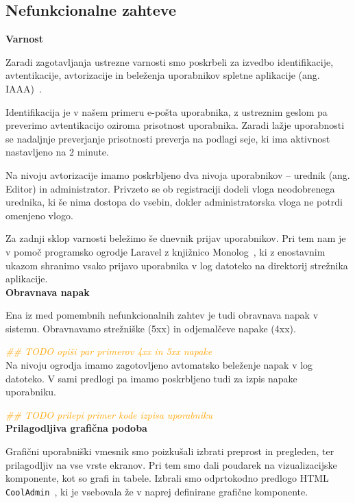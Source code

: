 \documentclass[a4paper, 12pt]{book}
\begin{document}
\clearpage



\subsection{Nefunkcionalne zahteve}

\noindent \textbf{Varnost}

Zaradi zagotavljanja ustrezne varnosti smo poskrbeli za izvedbo identifikacije, avtentikacije, avtorizacije in beleženja uporabnikov spletne aplikacije (ang. IAAA)~\cite{IAAA-security}.

Identifikacija je v našem primeru e-pošta uporabnika, z ustreznim geslom pa preverimo avtentikacijo oziroma prisotnost uporabnika. Zaradi lažje uporabnosti se nadaljnje preverjanje prisotnosti preverja na podlagi seje, ki ima aktivnost nastavljeno na 2 minute. 

Na nivoju avtorizacije imamo poskrbljeno dva nivoja uporabnikov – urednik (ang. Editor) in administrator. Privzeto se ob registraciji dodeli vloga neodobrenega urednika, ki še nima dostopa do vsebin, dokler administratorska vloga ne potrdi omenjeno vlogo.

Za zadnji sklop varnosti beležimo še dnevnik prijav uporabnikov. Pri tem nam je v pomoč programsko ogrodje Laravel z knjižnico Monolog~\cite{laravel-monolog}, ki z enostavnim ukazom shranimo vsako prijavo uporabnika v log datoteko na direktorij strežnika aplikacije. \\

\noindent \textbf{Obravnava napak}

Ena iz med pomembnih nefunkcionalnih zahtev je tudi obravnava napak v sistemu. Obravnavamo strežniške (5xx) in odjemalčeve napake (4xx). 

\textcolor{orange}{\textit{\#\# TODO opiši par primerov 4xx in 5xx napake}} \\

Na nivoju ogrodja imamo zagotovljeno avtomatsko beleženje napak v log datoteko. V sami predlogi pa imamo poskrbljeno tudi za izpis napake uporabniku.

\textcolor{orange}{\textit{\#\# TODO prilepi primer kode izpisa uporabniku}} \\

\noindent \textbf{Prilagodljiva grafična podoba}

Grafični uporabniški vmesnik smo poizkušali izbrati preprost in pregleden, ter prilagodljiv na vse vrste ekranov. Pri tem smo dali poudarek na vizualizacijske komponente, kot so grafi in tabele. Izbrali smo odprtokodno predlogo HTML {\tt CoolAdmin}~\cite{cooladmin-html-template}, ki je vsebovala že v naprej definirane grafične komponente.
\end{document}
